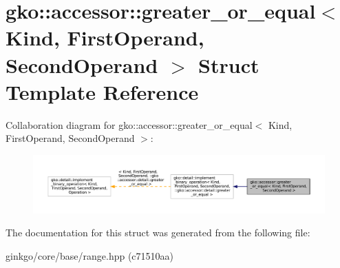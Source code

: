 \hypertarget{structgko_1_1accessor_1_1greater__or__equal}{}\section{gko\+:\+:accessor\+:\+:greater\+\_\+or\+\_\+equal$<$ Kind, First\+Operand, Second\+Operand $>$ Struct Template Reference}
\label{structgko_1_1accessor_1_1greater__or__equal}


Collaboration diagram for gko\+:\+:accessor\+:\+:greater\+\_\+or\+\_\+equal$<$ Kind, First\+Operand, Second\+Operand $>$\+:
\nopagebreak
\begin{figure}[H]
\begin{center}
\leavevmode
\includegraphics[width=350pt]{structgko_1_1accessor_1_1greater__or__equal__coll__graph}
\end{center}
\end{figure}


The documentation for this struct was generated from the following file\+:\begin{DoxyCompactItemize}
\item 
ginkgo/core/base/range.\+hpp (c71510aa)\end{DoxyCompactItemize}
